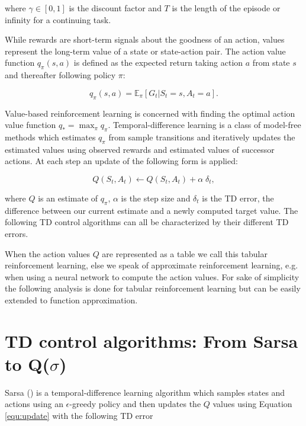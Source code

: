 \documentclass{article} %
\begin{document}
where $\gamma \in [0, 1]$ is the discount factor and $T$ is the length of the episode or infinity for a continuing task.

While rewards are short-term signals about the goodness of an action, values represent the long-term value of a state or state-action pair. The action value function $q_\pi(s, a)$ is defined as the expected return taking action $a$ from state $s$ and thereafter following policy $\pi$:

\begin{equation} 
q_\pi(s, a) = \mathbb{E}_\pi[G_t | S_t = s, A_t = a].
\label{actionvalue}
\end{equation}

Value-based reinforcement learning is concerned with finding the optimal action value function $q_* = \max_\pi q_\pi$. Temporal-difference learning is a class of model-free methods which estimates $q_\pi$ from sample transitions and iteratively updates the estimated values using observed rewards and estimated values of successor actions. At each step an update of the following form is applied:

\begin{equation} 
Q(S_t, A_t) \leftarrow Q(S_t, A_t) + \alpha \; \delta_t,
\label{equ:update}
\end{equation}

where $Q$ is an estimate of $q_\pi$, $\alpha$ is the step size and $\delta_t$ is the TD error, the difference between our current estimate and a newly computed target value. The following TD control algorithms can all be characterized by their different TD errors.

When the action values $Q$ are represented as a table we call this tabular reinforcement learning, else we speak of approximate reinforcement learning, e.g. when using a neural network to compute the action values. For sake of simplicity the following analysis is done for tabular reinforcement learning but can be easily extended to function approximation.

\section[TD control algorithms]{TD control algorithms: From Sarsa to Q($\sigma$)}

Sarsa (\cite{sarsa}) is a temporal-difference learning algorithm which samples states and actions using an $\epsilon$-greedy policy and then updates the $Q$ values using Equation \ref{equ:update} with the following TD error 
\end{document}

